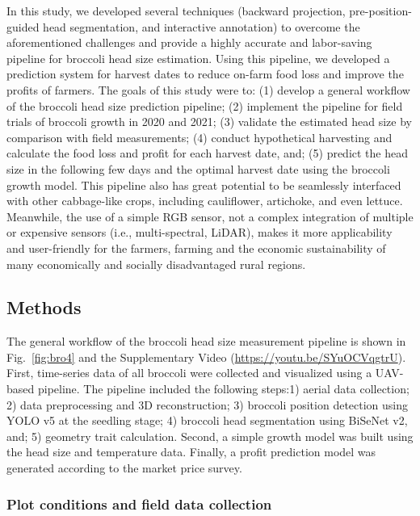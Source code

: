 In this study, we developed several techniques (backward projection, pre-position-guided head segmentation, and interactive annotation) to overcome the aforementioned challenges and provide a highly accurate and labor-saving pipeline for broccoli head size estimation. Using this pipeline, we developed a prediction system for harvest dates to reduce on-farm food loss and improve the profits of farmers. The goals of this study were to: (1) develop a general workflow of the broccoli head size prediction pipeline; (2) implement the pipeline for field trials of broccoli growth in 2020 and 2021; (3) validate the estimated head size by comparison with field measurements; (4) conduct hypothetical harvesting and calculate the food loss and profit for each harvest date, and; (5) predict the head size in the following few days and the optimal harvest date using the broccoli growth model. This pipeline also has great potential to be seamlessly interfaced with other cabbage-like crops, including cauliflower, artichoke, and even lettuce. Meanwhile, the use of a simple RGB sensor, not a complex integration of multiple or expensive sensors (i.e., multi-spectral, LiDAR), makes it more applicability and user-friendly for the farmers, farming and the economic sustainability of many economically and socially disadvantaged rural regions. 

\subsection{Methods}

The general workflow of the broccoli head size measurement pipeline is shown in Fig.~\ref{fig:bro4} and the Supplementary Video (\url{https://youtu.be/SYuOCVqgtrU}). First, time-series data of all broccoli were collected and visualized using a UAV-based pipeline. The pipeline included the following steps:1) aerial data collection; 2) data preprocessing and 3D reconstruction; 3) broccoli position detection using YOLO v5 at the seedling stage; 4) broccoli head segmentation using BiSeNet v2, and; 5) geometry trait calculation. Second, a simple growth model was built using the head size and temperature data. Finally, a profit prediction model was generated according to the market price survey.



\subsubsection{Plot conditions and field data collection}

